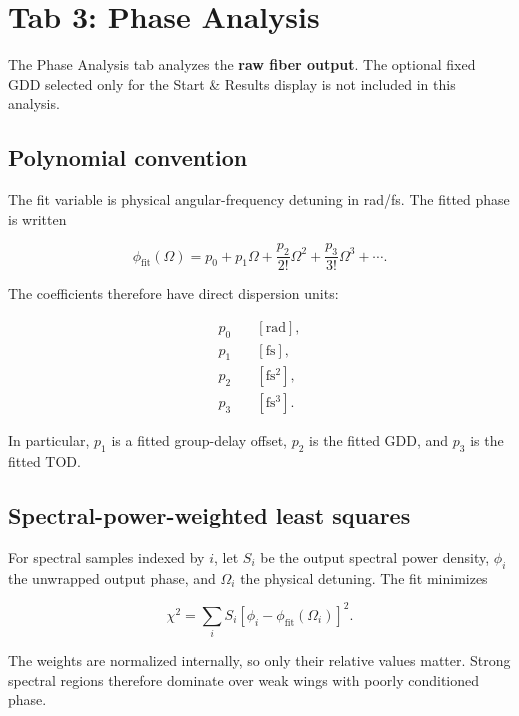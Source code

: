 \documentclass[11pt,a4paper]{article}
\begin{document}
\section{Tab 3: Phase Analysis}

The Phase Analysis tab analyzes the \textbf{raw fiber output}. The optional
fixed GDD selected only for the Start \& Results display is not included in this
analysis.

\subsection{Polynomial convention}

The fit variable is physical angular-frequency detuning in rad/fs. The fitted
phase is written

\begin{equation}
\boxed{
\phi_{\mathrm{fit}}(\Omega)
=
p_0
+p_1\Omega
+\frac{p_2}{2!}\Omega^2
+\frac{p_3}{3!}\Omega^3
+\cdots.
}
\end{equation}

The coefficients therefore have direct dispersion units:

\begin{align}
p_0 &\quad [\mathrm{rad}],\\
p_1 &\quad [\mathrm{fs}],\\
p_2 &\quad [\mathrm{fs^2}],\\
p_3 &\quad [\mathrm{fs^3}].
\end{align}

In particular, $p_1$ is a fitted group-delay offset, $p_2$ is the fitted GDD,
and $p_3$ is the fitted TOD.

\subsection{Spectral-power-weighted least squares}

For spectral samples indexed by $i$, let $S_i$ be the output spectral power
density, $\phi_i$ the unwrapped output phase, and $\Omega_i$ the physical
detuning. The fit minimizes

\begin{equation}
\boxed{
\chi^2
=
\sum_i S_i
\left[
\phi_i-\phi_{\mathrm{fit}}(\Omega_i)
\right]^2.
}
\end{equation}

The weights are normalized internally, so only their relative values matter.
Strong spectral regions therefore dominate over weak wings with poorly
conditioned phase.
\end{document}
